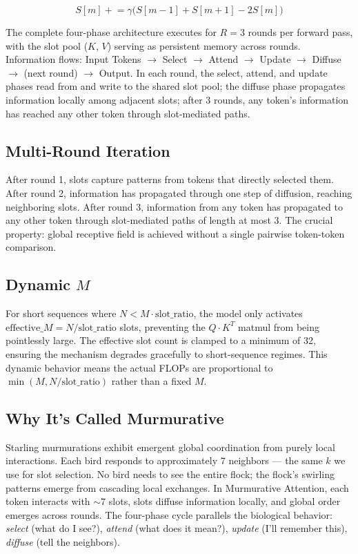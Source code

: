 \documentclass{article}
\begin{document}
\begin{equation}
S[m] \mathrel{+}= \gamma\bigl(S[m-1] + S[m+1] - 2S[m]\bigr)
\label{eq:diffusion}
\end{equation}

The complete four-phase architecture executes for $R=3$ rounds per forward pass, with the slot pool ($K$, $V$) serving as persistent memory across rounds. Information flows: Input Tokens $\rightarrow$ Select $\rightarrow$ Attend $\rightarrow$ Update $\rightarrow$ Diffuse $\rightarrow$ (next round) $\rightarrow$ Output. In each round, the select, attend, and update phases read from and write to the shared slot pool; the diffuse phase propagates information locally among adjacent slots; after 3 rounds, any token's information has reached any other token through slot-mediated paths.

\subsection{Multi-Round Iteration}

After round 1, slots capture patterns from tokens that directly selected them. After round 2, information has propagated through one step of diffusion, reaching neighboring slots. After round 3, information from any token has propagated to any other token through slot-mediated paths of length at most 3. The crucial property: global receptive field is achieved without a single pairwise token-token comparison.

\subsection{Dynamic $M$}

For short sequences where $N < M \cdot \mathrm{slot\_ratio}$, the model only activates $\mathrm{effective\_}M = N / \mathrm{slot\_ratio}$ slots, preventing the $Q \cdot K^T$ matmul from being pointlessly large. The effective slot count is clamped to a minimum of 32, ensuring the mechanism degrades gracefully to short-sequence regimes. This dynamic behavior means the actual FLOPs are proportional to $\min(M, N/\mathrm{slot\_ratio})$ rather than a fixed $M$.

\subsection{Why It's Called Murmurative}

Starling murmurations exhibit emergent global coordination from purely local interactions. Each bird responds to approximately 7 neighbors — the same $k$ we use for slot selection. No bird needs to see the entire flock; the flock's swirling patterns emerge from cascading local exchanges. In Murmurative Attention, each token interacts with $\sim\!7$ slots, slots diffuse information locally, and global order emerges across rounds. The four-phase cycle parallels the biological behavior: \textit{select} (what do I see?), \textit{attend} (what does it mean?), \textit{update} (I'll remember this), \textit{diffuse} (tell the neighbors).
\end{document}
